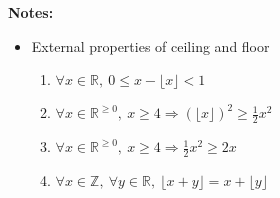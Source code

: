 \documentclass[12pt]{article}
\begin{document}
\begin{enumerate}[a.]
    \bigskip

    \textbf{Notes:}

    \begin{itemize}
        \item External properties of ceiling and floor

        \begin{enumerate}[1.]
            \item $\forall x \in \mathbb{R},\: 0 \leq x - \lfloor x \rfloor < 1$
            \item $\forall x \in \mathbb{R}^{\geq 0},\:x \geq 4 \Rightarrow (\lfloor x \rfloor)^2 \geq \frac{1}{2}x^2$
            \item $\forall x \in \mathbb{R}^{\geq 0},\:x \geq 4 \Rightarrow \frac{1}{2}x^2 \geq 2x$
            \item $\forall x \in \mathbb{Z},\:\forall y \in \mathbb{R},\:\lfloor x+y \rfloor = x + \lfloor y \rfloor$
        \end{enumerate}
    \end{itemize}


\end{enumerate}
\end{document}
